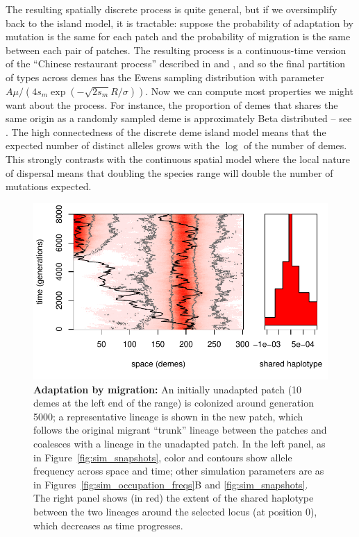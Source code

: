 \documentclass{article}
\newcommand{\citet}[1]{\cite{#1}}
\begin{document}
The resulting spatially discrete process is quite general,
but if we oversimplify back to the island model, it is tractable:
suppose the probability of adaptation by mutation is the same for each patch
and the probability of migration is the same between each pair of patches.
The resulting process is a continuous-time version of the ``Chinese restaurant process''
described in \citet{aldous1985exchangeability} and \citet{pitman1995partitions},
and so the final partition of types across demes has the Ewens
sampling distribution with parameter $A \mu / (4 s_m \exp (-\sqrt{2 s_m}R/\sigma))$.
Now we can compute most properties we might want about the process.
For instance, the proportion of demes that shares the same origin as a randomly sampled deme
is approximately Beta distributed -- see \cite{donnelly1989continuity}.
The high connectedness of the discrete deme island model means that the expected number of distinct alleles
grows with the $\log$ of the number of demes.
This strongly contrasts with the continuous spatial model 
where the local nature of dispersal means that doubling the species range will double the number of mutations expected. 


\begin{figure}[ht]
  \begin{center}
      \includegraphics{sim-transit}
  \end{center}
  \caption{
  \textbf{Adaptation by migration:}
  An initially unadapted patch (10 demes at the left end of the range) is colonized around generation 5000;
  a representative lineage is shown in the new patch, which follows the original migrant ``trunk'' lineage
  between the patches and coalesces with a lineage in the unadapted patch.
  In the left panel, as in Figure~\ref{fig:sim_snapshots}, color and contours show allele frequency across space and time;
  other simulation parameters are as in Figures~\ref{fig:sim_occupation_freqs}B and \ref{fig:sim_snapshots}.
  The right panel shows (in red) the extent of the shared haplotype between the two lineages around the selected locus (at position 0),
  which decreases as time progresses. 
  \label{fig:lineagesmotion}
  }
\end{figure}
\end{document}

